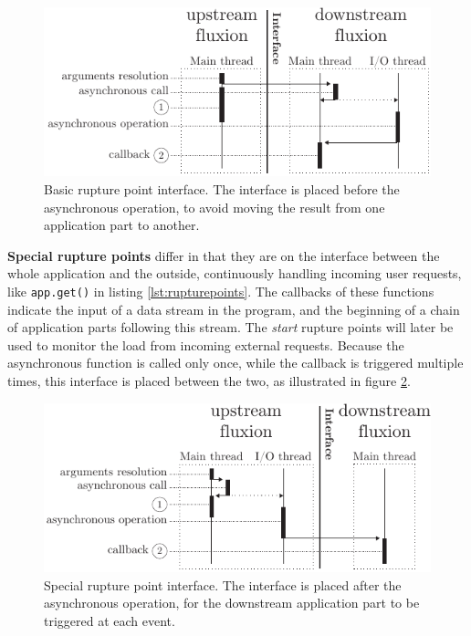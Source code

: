 \begin{figure}[h!]
\begin{center}
  \includegraphics[width=\linewidth]{ressources/basicrp.pdf}
  \caption{Basic rupture point interface. \textnormal{The interface is placed before the asynchronous operation, to avoid moving the result from one application part to another.}}
  \label{fig:basicrp}
\end{center}
\end{figure}

\textbf{Special rupture points} differ in that they are on the interface between the whole application and the outside, continuously handling incoming user requests, like \texttt{app.get()} in listing \ref{lst:rupturepoints}.
The callbacks of these functions indicate the input of a data stream in the program, and the beginning of a chain of application parts following this stream.
The \textit{start} rupture points will later be used to monitor the load from incoming external requests.
Because the asynchronous function is called only once, while the callback is triggered multiple times, this interface is placed between the two, as illustrated in figure \ref{fig:specialrp}.

\begin{figure}[h!]
\begin{center}
  \includegraphics[width=\linewidth]{ressources/specialrp.pdf}
  \caption{Special rupture point interface. \textnormal{The interface is placed after the asynchronous operation, for the downstream application part to be triggered at each event.}}
  \label{fig:specialrp}
\end{center}
\end{figure}

